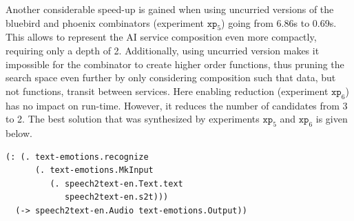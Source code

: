 \documentclass[]{report}
\begin{document}
Another considerable speed-up is gained when using uncurried versions
of the bluebird and phoenix combinators (experiment $\texttt{xp}_5$)
going from 6.86s to 0.69s.  This allows to represent the AI service
composition even more compactly, requiring only a depth of 2.
Additionally, using uncurried version makes it impossible for the
combinator to create higher order functions, thus pruning the search
space even further by only considering composition such that data, but
not functions, transit between services.  Here enabling reduction
(experiment $\texttt{xp}_6$) has no impact on run-time.  However, it
reduces the number of candidates from 3 to 2.  The best solution that
was synthesized by experiments $\texttt{xp}_5$ and $\texttt{xp}_6$ is
given below.
\begin{verbatim}
(: (. text-emotions.recognize
      (. text-emotions.MkInput
         (. speech2text-en.Text.text
            speech2text-en.s2t)))
  (-> speech2text-en.Audio text-emotions.Output))
\end{verbatim}
\end{document}
